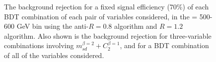 \begin{figure}
\centering
{}
\caption{The background rejection
for a fixed signal efficiency (70\%) of each BDT combination of
each pair of variables considered, in the \pT = 500-600 GeV bin using the anti-\kT $R=0.8$
algorithm and $R=1.2$ algorithm. Also shown is the background
rejection for three-variable combinations involving $m_{sd}^{\beta=2} +
C_2^{\beta=1}$, and for a BDT combination of all of the variables considered.}
\label{fig:pt500_comb2D}
\end{figure}

